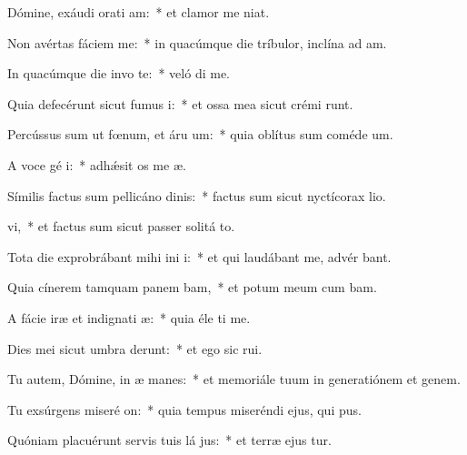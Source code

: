 \item Dómine, exáudi orati am:~* et clamor me   niat.
\item Non avértas fáciem   me:~* in quacúmque die tríbulor, inclína ad   am.
\item In quacúmque die invo te:~* veló di me.
\item Quia defecérunt sicut fumus  i:~* et ossa mea sicut crémi runt.
\item Percússus sum ut fœnum, et áru  um:~* quia oblítus sum coméde  um.
\item A voce gé i:~* adhǽsit os me  æ.
\item Símilis factus sum pellicáno dinis:~* factus sum sicut nyctícorax  lio.
\item {}vi,~* et factus sum sicut passer solitá  to.
\item Tota die exprobrábant mihi ini i:~* et qui laudábant me, advér  bant.
\item Quia cínerem tamquam panem bam,~* et potum meum cum  bam.
\item A fácie iræ et indignati æ:~* quia éle ti me.
\item Dies mei sicut umbra derunt:~* et ego sic  rui.
\item Tu autem, Dómine, in æ manes:~* et memoriále tuum in generatiónem et genem.
\item Tu exsúrgens miseré on:~* quia tempus miseréndi ejus, qui  pus.
\item Quóniam placuérunt servis tuis lá jus:~* et terræ ejus tur.
